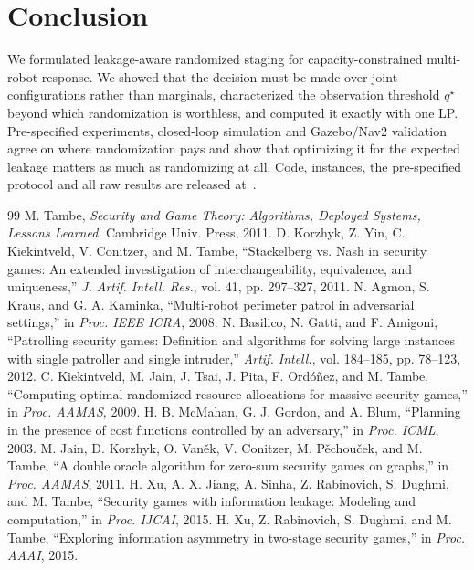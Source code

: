 \documentclass[10pt,twocolumn,letterpaper]{article}
\theoremstyle{remark}
\begin{document}
\section{Conclusion}
We formulated leakage-aware randomized staging for capacity-constrained multi-robot response. We showed that the decision must be made over joint configurations rather than marginals, characterized the observation threshold $q^\star$ beyond which randomization is worthless, and computed it exactly with one LP. Pre-specified experiments, closed-loop simulation and Gazebo/Nav2 validation agree on where randomization pays and show that optimizing it for the expected leakage matters as much as randomizing at all. Code, instances, the pre-specified protocol and all raw results are released at~\cite{alam2026code}.

\small
\begin{thebibliography}{99}
 M. Tambe, \emph{Security and Game Theory: Algorithms, Deployed Systems, Lessons Learned}. Cambridge Univ. Press, 2011.
 D. Korzhyk, Z. Yin, C. Kiekintveld, V. Conitzer, and M. Tambe, ``Stackelberg vs. Nash in security games: An extended investigation of interchangeability, equivalence, and uniqueness,'' \emph{J. Artif. Intell. Res.}, vol. 41, pp. 297--327, 2011.
 N. Agmon, S. Kraus, and G. A. Kaminka, ``Multi-robot perimeter patrol in adversarial settings,'' in \emph{Proc. IEEE ICRA}, 2008.
 N. Basilico, N. Gatti, and F. Amigoni, ``Patrolling security games: Definition and algorithms for solving large instances with single patroller and single intruder,'' \emph{Artif. Intell.}, vol. 184--185, pp. 78--123, 2012.
 C. Kiekintveld, M. Jain, J. Tsai, J. Pita, F. Ord\'o\~nez, and M. Tambe, ``Computing optimal randomized resource allocations for massive security games,'' in \emph{Proc. AAMAS}, 2009.
 H. B. McMahan, G. J. Gordon, and A. Blum, ``Planning in the presence of cost functions controlled by an adversary,'' in \emph{Proc. ICML}, 2003.
 M. Jain, D. Korzhyk, O. Van\v{e}k, V. Conitzer, M. P\v{e}chou\v{c}ek, and M. Tambe, ``A double oracle algorithm for zero-sum security games on graphs,'' in \emph{Proc. AAMAS}, 2011.
 H. Xu, A. X. Jiang, A. Sinha, Z. Rabinovich, S. Dughmi, and M. Tambe, ``Security games with information leakage: Modeling and computation,'' in \emph{Proc. IJCAI}, 2015.
 H. Xu, Z. Rabinovich, S. Dughmi, and M. Tambe, ``Exploring information asymmetry in two-stage security games,'' in \emph{Proc. AAAI}, 2015.

\end{thebibliography}
\end{document}
